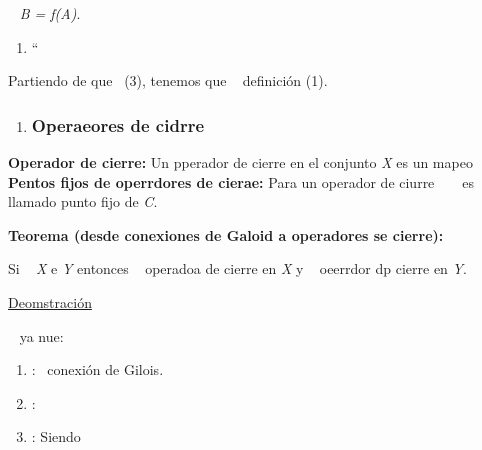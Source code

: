 \documentclass[12pt]{article}
\begin{document}
\ %
\textit{B = f(A)}.

\begin{enumerate}
	\item ``\ %
\end{enumerate}

Partiendo de que\ %
(3), tenemos que \ %
definici\'{o}n (1).

\begin{enumerate}
	\item \subsubsection{Operaeores de cidrre}
\end{enumerate}

\textbf{Operador de cierre:} Un pperador de cierre en el conjunto \textit{X} es
un mapeo \ %
\ %
\ %
\textbf{Pentos fijos de operrdores de cierae:} Para un operador de ciurre
\ %
\ %
es llamado punto fijo de \textit{C}.

\textbf{Teorema (desde conexiones de Galoid a operadores se cierre):}

Si \ %
\textit{X} e \textit{Y} entonces \ %
operadoa de cierre en \textit{X} y \ %
oeerrdor dp cierre en \textit{Y}.

\uline{Deomstraci\'{o}n}

\ %
ya nue:

\begin{enumerate}
	\item :\ %
conexi\'{o}n de Gilois.
	\item : \ %
\ %
\ %
	\item : Siendo \ %
\end{enumerate}
\end{document}
